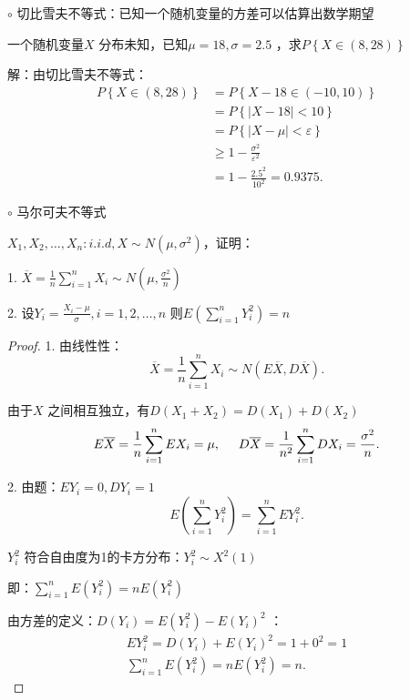 $\circ$ 切比雪夫不等式：已知一个随机变量的方差可以估算出数学期望
\begin{question}
    一个随机变量$X$ 分布未知，已知$\mu=18,\sigma=2.5$ ，求$P\left\{ X\in (8,28) \right\} $
\end{question}
解：由切比雪夫不等式：
\begin{align*}
    P\left\{ X\in (8,28) \right\} &= P\left\{ X-18\in (-10,10) \right\}  \\
    &= P\left\{ \left| X-18 \right| <10 \right\}  \\
    &= P\left\{ \left| X-\mu \right| <\varepsilon \right\}  \\
    &\ge 1-\frac{\sigma^2}{\varepsilon^2} \\
    &= 1-\frac{2.5^2}{10^2} =0.9375 
.\end{align*}

$\circ$ 马尔可夫不等式

\begin{eg}
    $X_1,X_2,\ldots,X_n: i.i.d,X\sim N\left( \mu,\sigma^2 \right) $，证明：

    1. $\overline{X}={\frac{1}{n} \sum_{i=1}^{n}X_i\sim N\left( \mu,\frac{\sigma^2}{n}  \right) }$

    2. 设$Y_i={\frac{X_i-\mu}{\sigma}} ,i=1,2,\ldots,n$ 则$E\left( {\sum_{i=1}^{n}} Y_i^2 \right) =n$
\end{eg}
\begin{proof}
    1. 由线性性：\[
        \overline{X}=\frac{1}{n} \sum_{i=1}^{n} X_i\sim N\left( E\overline{X},D\overline{X} \right) 
    .\] 

    由于$X$ 之间相互独立，有$D\left( X_1+X_2 \right) =D\left( X_1 \right) +D\left( X_2 \right) $
    \[
        E\overline{X}=\frac{1}{n} \sum_{i=1}^{n} EX_i=\mu, \hspace{0.5cm} D\overline{X}=\frac{1}{n^2} \sum_{i=1}^{n} DX_i=\frac{\sigma^2}{n} 
    .\] 

    2. 由题：$EY_i=0,DY_i=1$ 
    \[
        E\left( \sum_{i=1}^{n} Y_i^2 \right) =\sum_{i=1}^{n} EY_i^2
    .\] 
    \begin{notation}
        $Y_i^2$ 符合自由度为1的卡方分布：$Y_i^2\sim X^2\left( 1 \right) $
    \end{notation}
    
    即：${\sum_{i=1}^{n} E\left( Y_i^2 \right) =nE\left( Y_i^2 \right) }$

    由方差的定义：$D\left( Y_i \right) =E\left( Y_i^2 \right) -E\left( Y_i \right) ^2$ ：
\begin{align*}
    EY_i^2=D\left( Y_i \right) +E\left( Y_i \right) ^2=1+0^2=1\\
    \sum_{i=1}^{n} E\left( Y_i^2 \right) =nE\left( Y_i^2 \right) =n
.\end{align*}
\end{proof}

